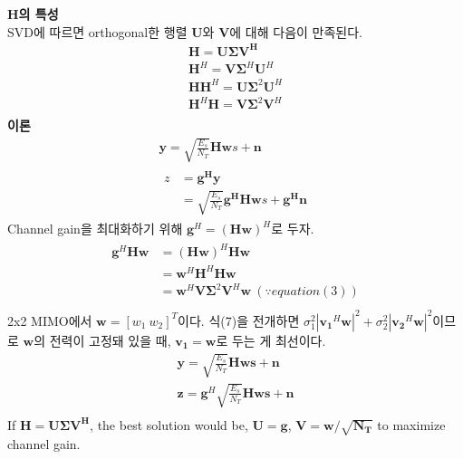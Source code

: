 \documentclass{article}
\newcommand{\bd}{\textbf} %
\begin{document}
\bd{$\boldsymbol{H}$의 특성}\\
SVD에 따르면 orthogonal한 행렬 $\boldsymbol{U}$와 $\boldsymbol{V}$에 대해 다음이 만족된다.
\begin{gather}
\boldsymbol{H}=\boldsymbol{U\Sigma V^H}\\
\boldsymbol{H}^H=\boldsymbol{V}\boldsymbol{\Sigma}^H \boldsymbol{U}^H\\
\boldsymbol{H}\boldsymbol{H}^H=\boldsymbol{U}\boldsymbol{\Sigma}^2\boldsymbol{U}^H\\
\boldsymbol{H}^H\boldsymbol{H}=\boldsymbol{V}\boldsymbol{\Sigma}^2\boldsymbol{V}^H\\
\end{gather}
\noindent
\bd{이론}\\
\begin{gather}
\boldsymbol{y}=\sqrt{\frac{E_s}{N_T}}\boldsymbol{Hw}s+\boldsymbol{n}\\
\begin{split}
z&=\boldsymbol{g^H y}\\
&=\sqrt{\frac{E_s}{N_T}}\boldsymbol{g^H Hw}s+\boldsymbol{g^H n}
\end{split}
\end{gather}
Channel gain을 최대화하기 위해 $\boldsymbol{g}^H=(\boldsymbol{Hw})^H$로 두자.
\begin{gather}
\begin{split}
\boldsymbol{g}^H \boldsymbol{Hw} &= (\boldsymbol{Hw})^H \boldsymbol{Hw}\\
&=\boldsymbol{w}^H\boldsymbol{H}^H \boldsymbol{Hw}\\
&=\boldsymbol{w}^H \boldsymbol{V}\boldsymbol{\Sigma}^2\boldsymbol{V}^H \boldsymbol{w}\ (\because equation (3))\\
\end{split}
\end{gather}
2x2 MIMO에서 $\boldsymbol{w}=[w_1\ w_2]^T$이다.
식(7)을 전개하면 $\sigma_1^2|\boldsymbol{v_1}^H\boldsymbol{w}|^2+\sigma_2^2|\boldsymbol{v_2}^H\boldsymbol{w}|^2$이므로 $\boldsymbol{w}$의 전력이 고정돼 있을 때, $\boldsymbol{v_1}=\boldsymbol{w}$로 두는 게 최선이다.
\begin{gather}
\boldsymbol{y} = \sqrt{\frac{E_s}{N_T}}\boldsymbol{Hws}+\boldsymbol{n}\\
\boldsymbol{z} = \boldsymbol{g}^H\sqrt{\frac{E_s}{N_T}}\boldsymbol{Hws}+\boldsymbol{n}\\
\end{gather}
If $\boldsymbol{H}=\boldsymbol{U\Sigma V^H}$, the best solution would be, $\boldsymbol{U}=\boldsymbol{g}$, $\boldsymbol{V}=\boldsymbol{w}/\boldsymbol{\sqrt{N_T}}$ to maximize channel gain.\\
\end{document}
